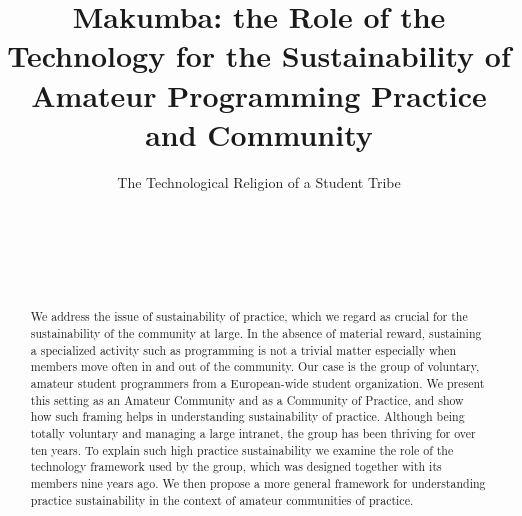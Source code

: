 \documentclass{acm_proc_article-sp}
\begin{document}
\title{Makumba: the Role of the Technology for the Sustainability of Amateur Programming Practice and Community}
\subtitle{The Technological Religion of a Student Tribe}


\author{
\alignauthor
\hspace{10mm} \\
       \affaddr{\hspace{10mm} }\\
       \affaddr{\hspace{10mm} }\\
       \affaddr{\hspace{10mm} }\\
       \email{\hspace{10mm} }
}

\maketitle
\begin{abstract}
We address the issue of sustainability of practice, which we regard as crucial for the sustainability of the community at large. In the absence of material reward, sustaining a specialized activity such as programming is not a trivial matter especially when members move often in and out of the community. Our case is the group of voluntary, amateur student programmers from a European-wide student organization. We present this setting as an Amateur Community and as a Community of Practice, and show how such framing helps in understanding sustainability of practice. Although being totally voluntary and managing a large intranet, the group has been thriving for over ten years. To explain such high practice sustainability we examine the role of the technology framework used by the group, which was designed together with its members nine years ago. We then propose a more general framework for understanding practice sustainability in the context of amateur communities of practice. 
\end{abstract}
\end{document}
